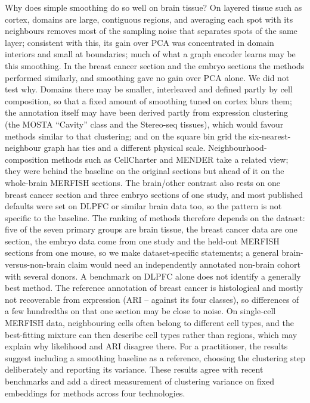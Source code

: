 \documentclass[unnumsec,webpdf,contemporary,large]{oup-authoring-template}
\begin{document}
Why does simple smoothing do so well on brain tissue? On layered tissue such as cortex, domains are large, contiguous regions, and
averaging each spot with its neighbours removes most of the sampling noise that separates spots of the same layer; consistent with this,
its gain over PCA was concentrated in domain interiors and small at boundaries; much of what a
graph encoder learns may be this smoothing. In the breast cancer section and the embryo sections the methods performed similarly,
and smoothing gave no gain over PCA alone. We did not test why. Domains there may be smaller, interleaved and defined partly by
cell composition, so that a fixed amount of smoothing tuned on cortex blurs them; the annotation itself may have been derived partly from
expression clustering (the MOSTA ``Cavity'' class and the Stereo-seq tissues), which would favour methods similar to that clustering; and on the square bin grid the
six-nearest-neighbour graph has ties and a different physical scale. Neighbourhood-composition methods such as CellCharter \citep{varrone2024cellcharter} and MENDER \citep{yuan2024mender} take a related
view; they were behind the baseline on the original sections but ahead of it on the whole-brain MERFISH sections. The brain/other contrast also rests on one breast cancer
section and three embryo sections of one study, and most published defaults were set on DLPFC or similar brain data too, so the pattern is not specific to the
baseline. The ranking of methods therefore depends on the dataset: five of the seven primary groups are brain tissue, the breast cancer data are one
section, the embryo data come from one study and the held-out MERFISH sections from one mouse, so we make dataset-specific statements; a
general brain-versus-non-brain claim would need an independently annotated non-brain cohort with several donors. A benchmark on DLPFC alone
does not identify a generally best method. The reference annotation of breast cancer is histological and mostly not recoverable from expression (ARI \brcaCoarseLo--\brcaCoarseHi{} against its four classes), so
differences of a few hundredths on that one section may be close to noise. On single-cell MERFISH data, neighbouring cells often belong to different cell types, and the
best-fitting mixture can then describe cell types rather than regions, which may explain why likelihood and ARI disagree there. For a
practitioner, the results suggest including a smoothing baseline as a reference, choosing the clustering step deliberately and reporting its
variance. These results agree with recent benchmarks \citep{explanatory2026,hu2024gbbench,nar2025bench} and add a direct measurement
of clustering variance on fixed embeddings for \lotNMethods{} methods across four technologies.
\end{document}
